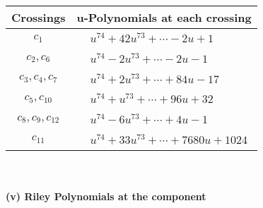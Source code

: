 \documentclass[1p]{elsarticle_modified}
\theoremstyle{definition}
\begin{document}
\begin{tabular}{m{50pt}|m{274pt}}
Crossings & \hspace{64pt}u-Polynomials at each crossing \\
\hline $$\begin{aligned}c_{1}\end{aligned}$$&$\begin{aligned}
&u^{74}+42 u^{73}+\cdots-2 u+1
\end{aligned}$\\
\hline $$\begin{aligned}c_{2},c_{6}\end{aligned}$$&$\begin{aligned}
&u^{74}-2 u^{73}+\cdots-2 u-1
\end{aligned}$\\
\hline $$\begin{aligned}c_{3},c_{4},c_{7}\end{aligned}$$&$\begin{aligned}
&u^{74}+2 u^{73}+\cdots+84 u-17
\end{aligned}$\\
\hline $$\begin{aligned}c_{5},c_{10}\end{aligned}$$&$\begin{aligned}
&u^{74}+u^{73}+\cdots+96 u+32
\end{aligned}$\\
\hline $$\begin{aligned}c_{8},c_{9},c_{12}\end{aligned}$$&$\begin{aligned}
&u^{74}-6 u^{73}+\cdots+4 u-1
\end{aligned}$\\
\hline $$\begin{aligned}c_{11}\end{aligned}$$&$\begin{aligned}
&u^{74}+33 u^{73}+\cdots+7680 u+1024
\end{aligned}$\\
\hline
\end{tabular}\\~\\
\newpage\renewcommand{\arraystretch}{1}
\flushleft \textbf{(v) Riley Polynomials at the component}\newline \\
\end{document}
